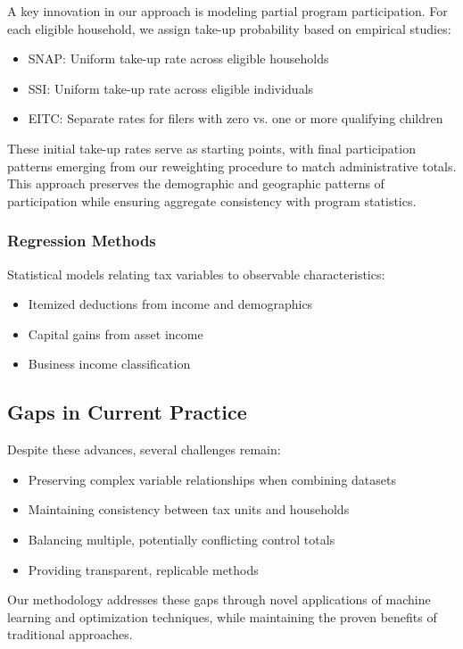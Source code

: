A key innovation in our approach is modeling partial program participation. For each eligible household, we assign take-up probability based on empirical studies:
\begin{itemize}
    \item SNAP: Uniform take-up rate across eligible households
    \item SSI: Uniform take-up rate across eligible individuals
    \item EITC: Separate rates for filers with zero vs. one or more qualifying children
\end{itemize}

These initial take-up rates serve as starting points, with final participation patterns emerging from our reweighting procedure to match administrative totals. This approach preserves the demographic and geographic patterns of participation while ensuring aggregate consistency with program statistics.

\subsubsection{Regression Methods}

Statistical models relating tax variables to observable characteristics:
\begin{itemize}
    \item Itemized deductions from income and demographics
    \item Capital gains from asset income
    \item Business income classification
\end{itemize}

\subsection{Gaps in Current Practice}

Despite these advances, several challenges remain:
\begin{itemize}
    \item Preserving complex variable relationships when combining datasets
    \item Maintaining consistency between tax units and households
    \item Balancing multiple, potentially conflicting control totals
    \item Providing transparent, replicable methods
\end{itemize}

Our methodology addresses these gaps through novel applications of machine learning and optimization techniques, while maintaining the proven benefits of traditional approaches.